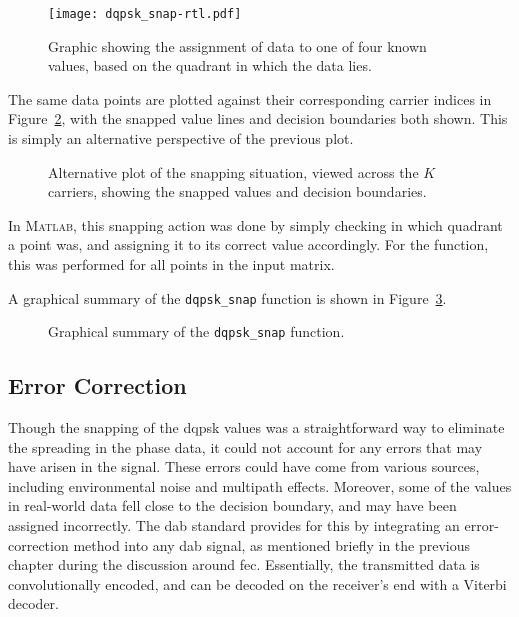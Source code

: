 \documentclass[class=report,11pt,crop=false]{standalone}
\begin{document}
\begin{figure}[htbp]
  \centering
  \captionsetup{type=figure}
  \texttt{[image: dqpsk\_snap-rtl.pdf]}
  \caption{Graphic showing the assignment of  data to one of four known values, based on the quadrant in which the data lies.}
  \label{fig:dqpsk_snap_rtl}
\end{figure}

The same data points are plotted against their corresponding carrier indices in Figure~\ref{fig:dqpsk_snap_rtl-alt}, with the snapped value lines and decision boundaries both shown. This is simply an alternative perspective of the previous plot.

\begin{figure}[htbp]
  \centering
  \captionsetup{type=figure}
  \def\svgwidth{0.9\linewidth}
  { %
      }
  \caption{Alternative plot of the  snapping situation, viewed across the \(K\) carriers, showing the snapped values and decision boundaries.}
  \label{fig:dqpsk_snap_rtl-alt}
\end{figure}

In \textsc{Matlab}, this snapping action was done by simply checking in which quadrant a point was, and assigning it to its correct value accordingly. For the function, this was performed for all points in the input matrix.

A graphical summary of the \texttt{dqpsk\_snap} function is shown in Figure~\ref{fig:dqpsk_snap}.

\begin{figure}[htbp]
  \centering
  \captionsetup{type=figure}
  \def\svgwidth{\linewidth}
  { %
      }
      \caption{Graphical summary of the \texttt{dqpsk\_snap} function.}
  \label{fig:dqpsk_snap}
\end{figure}

\subsection{Error Correction \label{subsect:dab-proc_error-correct}}
Though the snapping of the \gls{dqpsk} values was a straightforward way to eliminate the spreading in the phase data, it could not account for any errors that may have arisen in the signal. These errors could have come from various sources, including environmental noise and multipath effects. Moreover, some of the values in real-world data fell close to the decision boundary, and may have been assigned incorrectly. The \gls{dab} standard provides for this by integrating an error-correction method into any \gls{dab} signal, as mentioned briefly in the previous chapter during the discussion around \gls{fec}. Essentially, the transmitted data is convolutionally encoded, and can be decoded on the receiver's end with a Viterbi decoder.
\end{document}
